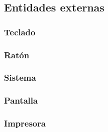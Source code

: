\subsection{Entidades externas}

  \subsubsection{Teclado}

  

  \subsubsection{Ratón}

  

  \subsubsection{Sistema}

  

  \subsubsection{Pantalla}

  

  \subsubsection{Impresora}

  